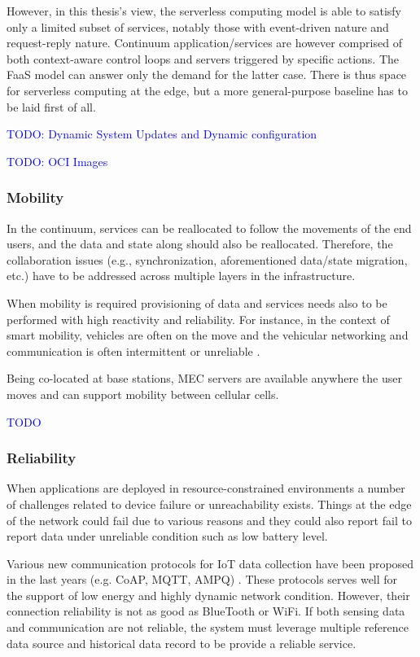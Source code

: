 \documentclass{ieeeaccess}
\begin{document}
However, in this thesis's view, the serverless computing model is able to satisfy only a limited subset of services, notably those with event-driven nature and request-reply nature. Continuum application/services are however comprised of both context-aware control loops and servers triggered by specific actions. The FaaS model can answer only the demand for the latter case. There is thus space for serverless computing at the edge, but a more general-purpose baseline has to be laid first of all.

\textcolor{blue}{TODO: Dynamic System Updates and Dynamic configuration}

\textcolor{blue}{TODO: OCI Images}

\subsubsection{Mobility}

In the continuum, services can be reallocated to follow the movements of the end users, and the data and state along should also be reallocated. Therefore, the collaboration issues (e.g., synchronization, aforementioned data/state migration, etc.) have to be addressed across multiple layers in the infrastructure.

When mobility is required provisioning of data and services needs also to be performed with high reactivity and reliability. For instance, in the context of smart mobility, vehicles are often on the move and the vehicular networking and communication is often intermittent or unreliable \cite{vehicular-data-cloud}.

Being co-located at base stations, MEC servers are available anywhere the user moves and can support mobility between cellular cells.

\textcolor{blue}{TODO}

\subsubsection{Reliability}

When applications are deployed in resource-constrained environments a number of challenges related to device failure or unreachability exists. Things at the edge of the network could fail due to various reasons and they could also report fail to report data under unreliable condition such as low battery level.

Various new communication protocols for IoT data collection have been proposed in the last years (e.g. CoAP, MQTT, AMPQ) \cite{mqtt-coap-amqp-http}. These protocols serves well for the support of low energy and highly dynamic network condition. However, their connection reliability is not as good as BlueTooth or WiFi. If both sensing data and communication are not reliable, the system must leverage multiple reference data source and historical data record to be provide a reliable service.
\end{document}
